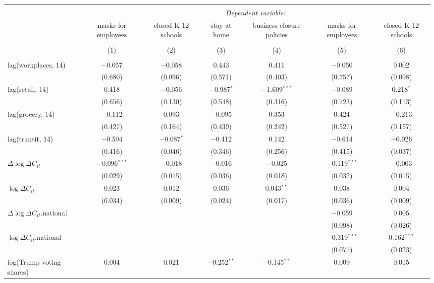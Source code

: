\begin{tabular}{@{\extracolsep{1pt}}lcccccc} 
\\[-1.8ex]\hline 
\hline \\[-1.8ex] 
 & \multicolumn{6}{c}{\textit{Dependent variable:}} \\ 
\cline{2-7} 
 & masks for employees & closed K-12 schools & stay at home & business closure policies & masks for employees & closed K-12 schools \\ 
\\[-1.8ex] & (1) & (2) & (3) & (4) & (5) & (6)\\ 
\hline \\[-1.8ex] 
 lag(workplaces, 14) & $-$0.057 & $-$0.058 & 0.443 & 0.411 & $-$0.050 & 0.002 \\ 
  & (0.680) & (0.096) & (0.571) & (0.403) & (0.757) & (0.098) \\ 
  lag(retail, 14) & 0.418 & $-$0.056 & $-$0.987$^{*}$ & $-$1.609$^{***}$ & $-$0.089 & 0.218$^{*}$ \\ 
  & (0.656) & (0.130) & (0.548) & (0.316) & (0.723) & (0.113) \\ 
  lag(grocery, 14) & $-$0.112 & 0.093 & $-$0.095 & 0.353 & 0.424 & $-$0.213 \\ 
  & (0.427) & (0.164) & (0.439) & (0.242) & (0.527) & (0.157) \\ 
  lag(transit, 14) & $-$0.504 & $-$0.087$^{*}$ & $-$0.412 & 0.142 & $-$0.614 & $-$0.026 \\ 
  & (0.416) & (0.046) & (0.346) & (0.256) & (0.415) & (0.037) \\ 
  $\Delta \log \Delta C_{it}$ & $-$0.096$^{***}$ & $-$0.018 & $-$0.016 & $-$0.025 & $-$0.119$^{***}$ & $-$0.003 \\ 
  & (0.029) & (0.015) & (0.036) & (0.018) & (0.032) & (0.015) \\ 
  $\log \Delta C_{it}$ & 0.023 & 0.012 & 0.036 & 0.043$^{**}$ & 0.038 & 0.004 \\ 
  & (0.034) & (0.009) & (0.024) & (0.017) & (0.036) & (0.009) \\ 
  $\Delta \log \Delta C_{it}$.national &  &  &  &  & $-$0.059 & 0.005 \\ 
  &  &  &  &  & (0.098) & (0.026) \\ 
  $\log \Delta C_{it}$.national &  &  &  &  & $-$0.319$^{***}$ & 0.162$^{***}$ \\ 
  &  &  &  &  & (0.077) & (0.023) \\ 
  log(Trump voting shares) & 0.004 & 0.021 & $-$0.252$^{**}$ & $-$0.145$^{**}$ & 0.009 & 0.015 \\ 

\end{tabular}
